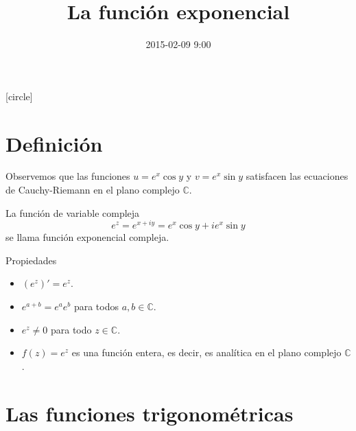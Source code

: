 \documentclass[spanish,presentation]{beamer}
\date{2015-02-09 9:00}
\title{La función exponencial}
\begin{document}
\maketitle
{}
[circle]

\tableofcontents

\section{Definición}
\label{sec-1}

\begin{frame}[label=sec-1-1]{}
\begin{block}{}
Observemos que las funciones \(u=e^{x}\cos y\) y \(v=e^{x}\sin y\)
satisfacen las ecuaciones de Cauchy-Riemann en el plano complejo
\(\mathbb{C}\). 
\end{block}

\begin{definition}
La función de variable compleja
\begin{displaymath}
e^{z}=e^{x+iy}=e^{x}\cos y+ie^{x}\sin y
\end{displaymath}
se llama \alert{función exponencial compleja}.
\end{definition}
\end{frame}

\begin{frame}[label=sec-1-2]{Propiedades}
\begin{itemize}
\item \((e^{z})'=e^{z}\).
\item \(e^{a+b}=e^{a}e^{b}\) para todos \(a,b\in \mathbb{C}\).
\item \(e^{z}\ne 0\) para todo \(z\in \mathbb{C}\).
\item \(f(z)=e^{z}\) es una función \alert{entera}, es decir, es analítica en
el plano complejo \(\mathbb{C}\).
\end{itemize}
\end{frame}

\section{Las funciones trigonométricas}
\label{sec-2}
\end{document}

